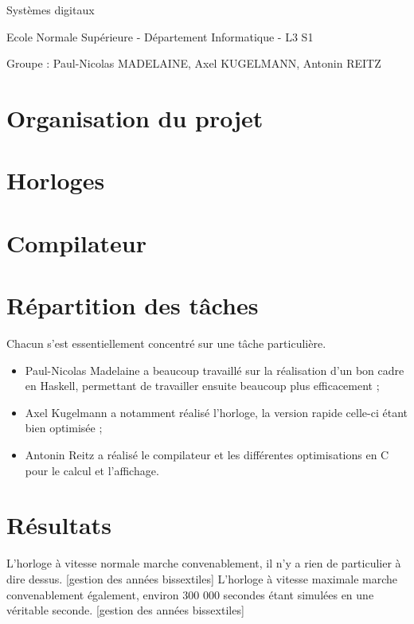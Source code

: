 \documentclass[a4paper,12pt,twoside]{article}
\begin{document}
\begin{center}
{\Huge Systèmes digitaux}
\end{center}
\begin{center}
{\Large Ecole Normale Supérieure - Département Informatique - L3 S1}
\end{center}

Groupe : Paul-Nicolas MADELAINE, Axel KUGELMANN, Antonin REITZ

\section{Organisation du projet}



\section{Horloges}



\section{Compilateur}



\section{Répartition des tâches}

Chacun s'est essentiellement concentré sur une tâche particulière.
\begin{itemize}
\item Paul-Nicolas Madelaine a beaucoup travaillé sur la réalisation d'un bon cadre en Haskell, permettant de travailler ensuite beaucoup plus efficacement ;
\item Axel Kugelmann a notamment réalisé l'horloge, la version rapide celle-ci étant bien optimisée ;
\item Antonin Reitz a réalisé le compilateur et les différentes optimisations en C pour le calcul et l'affichage.
\end{itemize}

\section{Résultats}

L'horloge à vitesse normale marche convenablement, il n'y a rien de particulier à dire dessus.
[gestion des années bissextiles]
L'horloge à vitesse maximale marche convenablement également, environ 300 000 secondes étant simulées en une véritable seconde.
[gestion des années bissextiles]
\end{document}
